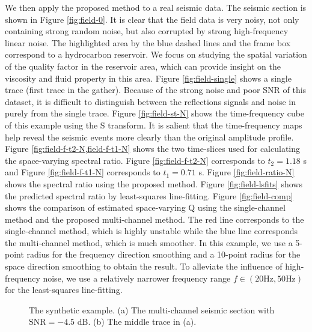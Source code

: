 We then apply the proposed method to a real seismic data. The seismic section is shown in Figure \ref{fig:field-0}. It is clear that the field data is very noisy, not only containing strong random noise, but also corrupted by strong high-frequency linear noise. The highlighted area by the blue dashed lines and the frame box correspond to a hydrocarbon reservoir. We focus on studying the spatial variation of the quality factor in the reservoir area, which can provide insight on the viscosity and fluid property in this area. Figure \ref{fig:field-single} shows a single trace (first trace in the gather). Because of the strong noise and poor SNR of this dataset, it is difficult to distinguish between the reflections signals and noise in purely from the single trace.
Figure \ref{fig:field-st-N} shows the time-frequency cube of this example using the S transform. It is salient that the time-frequency maps help reveal the seismic events more clearly than the original amplitude profile. Figure \ref{fig:field-f-t2-N,field-f-t1-N} shows the two time-slices used for calculating the space-varying spectral ratio.  Figure \ref{fig:field-f-t2-N} corresponds to $t_2=1.18$ s and Figure \ref{fig:field-f-t1-N} corresponds to $t_1=0.71$ s. Figure \ref{fig:field-ratio-N} shows the spectral ratio using the proposed method. Figure \ref{fig:field-lsfits} shows the predicted spectral ratio by least-squares line-fitting. Figure \ref{fig:field-comp} shows the comparison of estimated space-varying Q using the single-channel method and the proposed multi-channel method. The red line corresponds to the single-channel method, which is highly unstable while the blue line corresponds the multi-channel method, which is much smoother. In this example, we use a 5-point radius for the frequency direction smoothing and a 10-point radius for the space direction smoothing to obtain the result. To alleviate the influence of high-frequency noise, we use a relatively narrower frequency range $f\in(20 \text{Hz},50 \text{Hz})$ for the least-squares line-fitting. 



\begin{figure}[htb!]
	\centering
	\caption{The synthetic example. (a) The multi-channel seismic section with $\text{SNR}=-4.5$ dB. (b) The middle trace in (a).}
	\label{fig:traces,trace-15}
\end{figure}


